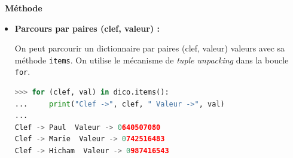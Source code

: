\documentclass[
  11pt,
]{article}
\newcommand{\passthrough}[1]{#1}
\newcounter{cours}
\newenvironment{methode}[1]
{\par \medskip    \noindent  
 \begin {bclogo}[arrondi =0.1,logo=\bcoutil, marge=4,noborder = true] {~\textbf{Méthode}   {\itshape #1} }  \par}
{
\end{bclogo}
 \par \bigskip }
\begin{document}
\begin{methode}{}
\begin{itemize}
\begin{lstlisting}[language=Python]
>>> for val in dico.values():
...     print("Valeur -> ", val)
... 
Valeur ->  0640507080
Valeur ->  0742516483
Valeur ->  0987416543
\end{lstlisting}
\item
  \textbf{Parcours par paires (clef, valeur) :}

  On peut parcourir un dictionnaire par paires (clef, valeur) valeurs
  avec sa méthode \passthrough{\lstinline!items!}. On utilise le
  mécanisme de \emph{tuple unpacking} dans la boucle
  \passthrough{\lstinline!for!}.

\begin{lstlisting}[language=Python]
>>> for (clef, val) in dico.items():
...     print("Clef ->", clef, " Valeur ->", val)
... 
Clef -> Paul  Valeur -> 0640507080
Clef -> Marie  Valeur -> 0742516483
Clef -> Hicham  Valeur -> 0987416543
\end{lstlisting}
\end{itemize}

\end{methode}
\end{document}
